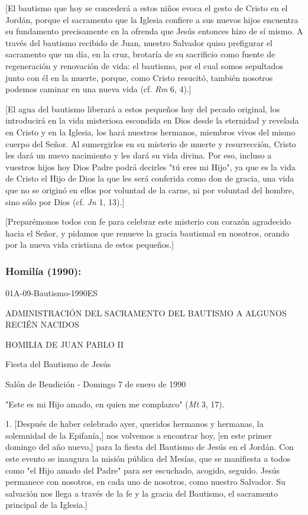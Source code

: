 \begin{body}
{[}El bautismo que hoy se concederá a estos niños evoca el gesto de Cristo en el Jordán, porque el sacramento que la Iglesia confiere a sus nuevos hijos encuentra su fundamento precisamente en la ofrenda que Jesús entonces hizo de sí mismo. A través del bautismo recibido de Juan, nuestro Salvador quiso prefigurar el sacramento que un día, en la cruz, brotaría de su sacrificio como fuente de regeneración y renovación de vida: el bautismo, por el cual somos sepultados junto con él en la muerte, porque, como Cristo resucitó, también nosotros podemos caminar en una nueva vida (cf. \emph{Rm} 6, 4).{]}

{[}El agua del bautismo liberará a estos pequeños hoy del pecado original, los introducirá en la vida misteriosa escondida en Dios desde la eternidad y revelada en Cristo y en la Iglesia, los hará nuestros hermanos, miembros vivos del mismo cuerpo del Señor. Al sumergirlos en su misterio de muerte y resurrección, Cristo les dará un nuevo nacimiento y les dará su vida divina. Por eso, incluso a vuestros hijos hoy Dios Padre podrá decirles "tú eres mi Hijo", ya que es la vida de Cristo el Hijo de Dios la que les será conferida como don de gracia, una vida que no se originó en ellos por voluntad de la carne, ni por voluntad del hombre, sino sólo por Dios (cf. \emph{Jn} 1, 13).{]}

{[}Preparémonos todos con fe para celebrar este misterio con corazón agradecido hacia el Señor, y pidamos que renueve la gracia bautismal en nosotros, orando por la nueva vida cristiana de estos pequeños.{]}

\subsubsection{Homilía (1990): } 01A-09-Bautismo-1990ES

ADMINISTRACIÓN DEL SACRAMENTO DEL BAUTISMO A ALGUNOS RECIÉN NACIDOS

HOMILIA DE JUAN PABLO II

Fiesta del Bautismo de Jesús

Salón de Bendición - Domingo 7 de enero de 1990

"Este es mi Hijo amado, en quien me complazco" (\emph{Mt} 3, 17).

1. {[}Después de haber celebrado ayer, queridos hermanos y hermanas, la solemnidad de la Epifanía,{]} nos volvemos a encontrar hoy, {[}en este primer domingo del año nuevo,{]} para la fiesta del Bautismo de Jesús en el Jordán. Con este evento se inaugura la misión pública del Mesías, que se manifiesta a todos como "el Hijo amado del Padre" para ser escuchado, acogido, seguido. Jesús permanece con nosotros, en cada uno de nosotros, como nuestro Salvador. Su salvación nos llega a través de la fe y la gracia del Bautismo, el sacramento principal de la Iglesia.{]}


\end{body}
